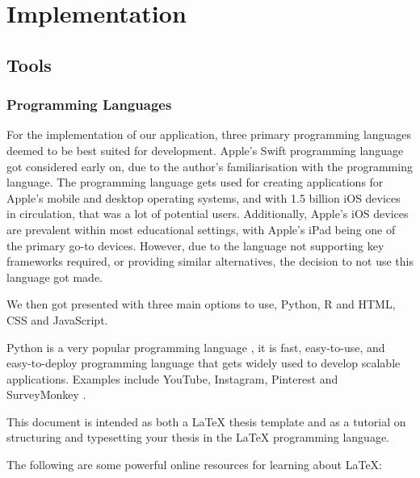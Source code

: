 \chapter{Implementation}
	\label{chap:implementation}
	
	\section{Tools}
	
	\subsection{Programming Languages}
	
	For the implementation of our application, three primary programming languages deemed to be best suited for development. Apple's Swift programming language \cite{swift} got considered early on, due to the author's familiarisation with the programming language. The programming language gets used for creating applications for Apple's mobile and desktop operating systems, and with 1.5 billion \cite{9to5mac} iOS devices in circulation, that was a lot of potential users. Additionally, Apple's iOS devices are prevalent within most educational settings, with Apple's iPad being one of the primary go-to devices. However, due to the language not supporting key frameworks required, or providing similar alternatives, the decision to not use this language got made. 
	
	We then got presented with three main options to use, Python, R and HTML, CSS and JavaScript.
	
	Python is a very popular programming language \cite{wired_python, sof_dev_servay20}, it is fast, easy-to-use, and easy-to-deploy programming language that gets widely used to develop scalable applications. Examples include YouTube, Instagram, Pinterest and SurveyMonkey \cite{hackr.io}. 
	
	
	
	
	
	
	
	This document is intended as both a LaTeX thesis template and as a tutorial on structuring and typesetting your thesis in the LaTeX programming language.
	
	The following are some powerful online resources for learning about LaTeX:
	
